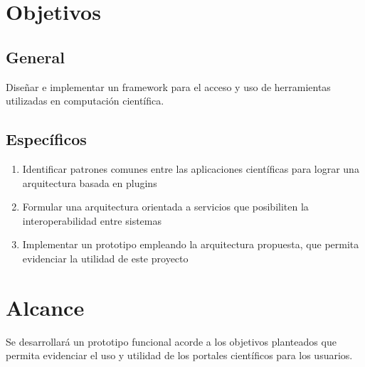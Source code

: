 \section{Objetivos}


\subsection{General}


Diseñar e implementar un framework para el acceso y uso de herramientas utilizadas en computación científica.


\subsection{Específicos}


\begin{enumerate}
\item Identificar patrones comunes entre las aplicaciones científicas para lograr una arquitectura basada en plugins
\item Formular una arquitectura orientada a servicios que posibiliten la interoperabilidad entre sistemas
\item Implementar un prototipo empleando la arquitectura propuesta, que permita evidenciar la utilidad de este proyecto
\end{enumerate}

\section{Alcance}


Se desarrollará un prototipo funcional acorde a los objetivos planteados que permita evidenciar el uso y utilidad de los portales científicos para los usuarios. 
